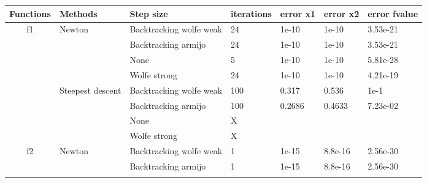\documentclass[a4paper,11pt]{article}
\numberwithin{equation}{section} %
\begin{document}

\begin{table}[h!]
\begin{tabular}{|c|l|l|l|l|l|l|}
\hline
\multicolumn{1}{|l|}{Functions} & Methods                           & Step size               & iterations & error x1 & error x2  & error fvalue \\ \hline
\multirow{8}{*}{f1}             & \multirow{4}{*}{Newton}           & Backtracking wolfe weak & 24         & 1e-10    & 1e-10     & 3.53e-21     \\ \cline{3-7} 
                                &                                   & Backtracking armijo     & 24         & 1e-10    & 1e-10     & 3.53e-21     \\ \cline{3-7} 
                                &                                   & None                    & 5          & 1e-10    & 1e-10     & 5.81e-28     \\ \cline{3-7} 
                                &                                   & Wolfe strong            & 24         & 1e-10    & 1e-10     & 4.21e-19     \\ \cline{2-7} 
                                & \multirow{4}{*}{Steepest descent} & Backtracking wolfe weak & 100        & 0.317    & 0.536     & 1e-1         \\ \cline{3-7} 
                                &                                   & Backtracking armijo     & 100        & 0.2686   & 0.4633    & 7.23e-02     \\ \cline{3-7} 
                                &                                   & None                    & X          &          &           &              \\ \cline{3-7} 
                                &                                   & Wolfe strong            & X          &          &           &              \\ \hline
\multirow{8}{*}{f2}             & \multirow{4}{*}{Newton}           & Backtracking wolfe weak & 1          & 1e-15    & 8.8e-16   & 2.56e-30     \\ \cline{3-7} 
                                &                                   & Backtracking armijo     & 1          & 1e-15    & 8.8e-16   & 2.56e-30     \\ \cline{3-7} 

\end{tabular}
\end{table}
\end{document}

